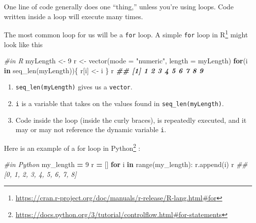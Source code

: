 \documentclass[
  12pt,
  krantz2]{krantz}
\makeatletter
\newenvironment{Shaded}{\begin{snugshade}}{\end{snugshade}}
\newcommand{\AttributeTok}[1]{\textcolor[rgb]{0.61,0.61,0.61}{#1}}
\newcommand{\BuiltInTok}[1]{#1}
\newcommand{\CommentTok}[1]{\textcolor[rgb]{0.37,0.37,0.37}{\textit{#1}}}
\newcommand{\ControlFlowTok}[1]{\textcolor[rgb]{0.27,0.27,0.27}{\textbf{#1}}}
\newcommand{\DecValTok}[1]{\textcolor[rgb]{0.06,0.06,0.06}{#1}}
\newcommand{\DocumentationTok}[1]{\textcolor[rgb]{0.37,0.37,0.37}{\textbf{\textit{#1}}}}
\newcommand{\FunctionTok}[1]{\textcolor[rgb]{0,0,0}{#1}}
\newcommand{\KeywordTok}[1]{\textcolor[rgb]{0.27,0.27,0.27}{\textbf{#1}}}
\newcommand{\NormalTok}[1]{#1}
\newcommand{\OperatorTok}[1]{\textcolor[rgb]{0.43,0.43,0.43}{\textbf{#1}}}
\newcommand{\OtherTok}[1]{\textcolor[rgb]{0.37,0.37,0.37}{#1}}
\newcommand{\StringTok}[1]{\textcolor[rgb]{0.5,0.5,0.5}{#1}}
\providecommand{\tightlist}{%
  \setlength{\itemsep}{0pt}\setlength{\parskip}{0pt}}
\renewcommand{\href}[2]{#2\footnote{\url{#1}}}
\newenvironment{kframe}{%
\medskip{}
\setlength{\fboxsep}{.8em}
 \def\at@end@of@kframe{}%
 \ifinner\ifhmode%
  \def\at@end@of@kframe{\end{minipage}}%
  \begin{minipage}{\columnwidth}%
 \fi\fi%
 \def\FrameCommand##1{\hskip\@totalleftmargin \hskip-\fboxsep
 \colorbox{shadecolor}{##1}\hskip-\fboxsep
     \hskip-\linewidth \hskip-\@totalleftmargin \hskip\columnwidth}%
 \MakeFramed {\advance\hsize-\width
   \@totalleftmargin\z@ \linewidth\hsize
   \@setminipage}}%
 {\par\unskip\endMakeFramed%
 \at@end@of@kframe}
\renewenvironment{Shaded}{\begin{kframe}}{\end{kframe}}
\makeatother
\begin{document}
One line of code generally does one ``thing,'' unless you're using loops. Code written inside a loop will execute many times.

The most common loop for us will be a \texttt{for} loop. A simple \href{https://cran.r-project.org/doc/manuals/r-release/R-lang.html\#for}{\texttt{for} loop in R} might look like this

\begin{Shaded}
\begin{Highlighting}[]
\CommentTok{\#in R}
\NormalTok{myLength }\OtherTok{\textless{}{-}} \DecValTok{9}
\NormalTok{r }\OtherTok{\textless{}{-}} \FunctionTok{vector}\NormalTok{(}\AttributeTok{mode =} \StringTok{"numeric"}\NormalTok{, }\AttributeTok{length =}\NormalTok{ myLength)}
\ControlFlowTok{for}\NormalTok{(i }\ControlFlowTok{in} \FunctionTok{seq\_len}\NormalTok{(myLength))\{}
\NormalTok{  r[i] }\OtherTok{\textless{}{-}}\NormalTok{ i}
\NormalTok{\}}
\NormalTok{r}
\DocumentationTok{\#\# [1] 1 2 3 4 5 6 7 8 9}
\end{Highlighting}
\end{Shaded}

\begin{enumerate}
\def\labelenumi{\arabic{enumi}.}
\tightlist
\item
  \texttt{seq\_len(myLength)} gives us a \texttt{vector}.
\item
  \texttt{i} is a variable that takes on the values found in \texttt{seq\_len(myLength)}.
\item
  Code inside the loop (inside the curly braces), is repeatedly executed, and it may or may not reference the dynamic variable \texttt{i}.
\end{enumerate}

\href{https://docs.python.org/3/tutorial/controlflow.html\#for-statements}{Here is an example of a for loop in Python} \citep{Lutz13}:

\begin{Shaded}
\begin{Highlighting}[]
\CommentTok{\#in Python}
\NormalTok{my\_length }\OperatorTok{=} \DecValTok{9}
\NormalTok{r }\OperatorTok{=}\NormalTok{ []}
\ControlFlowTok{for}\NormalTok{ i }\KeywordTok{in} \BuiltInTok{range}\NormalTok{(my\_length):}
\NormalTok{    r.append(i)}
\NormalTok{r}
\CommentTok{\#\# [0, 1, 2, 3, 4, 5, 6, 7, 8]}
\end{Highlighting}
\end{Shaded}
\end{document}
